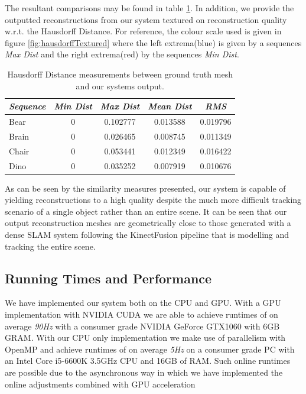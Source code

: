 The resultant comparisons may be found in table \ref{hausdorffTable}. In addition, we provide the outputted reconstructions from our system textured on reconstruction quality w.r.t. the Hausdorff Distance. 
For reference, the colour scale used is given in figure \ref{fig:hausdorffTextured} where the left extrema(blue) is given by a sequences \textit{Max Dist} and the right extrema(red) by the sequences \textit{Min Dist}. 
\begin{table}[!t]
	{
		\footnotesize
		\begin{center}
			\begin{tabular}{l c c c c}
				\emph{Sequence} & \emph{Min Dist} & \emph{Max Dist} & \emph{Mean Dist} & \emph{RMS}\\
				\midrule
				\textsf{Bear} & 0 & 0.102777 & 0.013588 & 0.019796 \\
				\textsf{Brain} & 0 & 0.026465 & 0.008745 & 0.011349 \\
				\textsf{Chair} & 0 & 0.053441 & 0.012349 & 0.016422 \\
				\textsf{Dino} & 0 & 0.035252 & 0.007919 & 0.010676
			\end{tabular}
		\end{center}
	}
\vspace{-3mm}
	\caption{Hausdorff Distance measurements between ground truth mesh and our systems output.}
	\label{hausdorffTable}
\end{table}
As can be seen by the similarity measures presented, our system is capable of yielding reconstructions to a high quality despite the much more difficult tracking scenario of a single object rather than an entire 
scene. It can be seen that our output reconstruction meshes are geometrically close to those generated with a dense SLAM system \cite{Prisacariu2014} following the KinectFusion \cite{Newcombe2011} pipeline that 
is modelling and tracking the entire scene.

\subsection{Running Times and Performance}
We have implemented our system both on the CPU and GPU. With a GPU implementation with NVIDIA CUDA we are able to achieve runtimes of on average \textit{90Hz} with a consumer grade NVIDIA GeForce GTX1060 with 
6GB GRAM. With our CPU only implementation we make use of parallelism with OpenMP and achieve runtimes of on average \textit{5Hz} on a consumer grade PC with an Intel Core i5-6600K 3.5GHz CPU and 16GB of RAM. Such 
online runtimes are possible due to the asynchronous way in which we have implemented the online adjustments combined with GPU acceleration